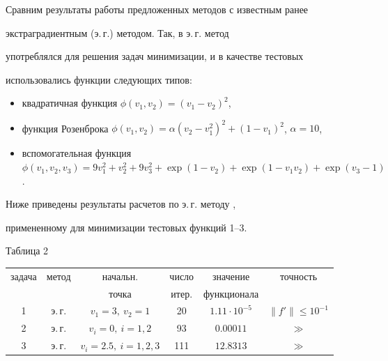  


Сравним результаты работы предложенных методов с известным ранее 


экстраградиентным (э.\,г.) методом. Так, в \cite{4} э.\,г. метод 


употреблялся для решения задач минимизации, и в качестве тестовых 


использовались функции следующих типов: 


\begin{itemize} 


\item[1.] квадратичная функция $\phi(v_1,v_2)=(v_1-v_2)^2$, 


\item[2.] функция Розенброка $\phi(v_1,v_2)=\alpha(v_2-v^2_1)^2+ 


(1-v_1)^2$, $\alpha=10$, 


\item[3.] вспомогательная функция $\phi(v_1,v_2,v_3)=9v^2_1+v^2_2+ 


9v^2_3+\exp(1-v_2)+\exp(1-v_1v_2)+\exp(v_3-1)$. 


\end{itemize}


 


Ниже приведены результаты расчетов по э.\,г. методу \cite{4}, 


примененному для минимизации тестовых функций 1--3. 


\smallskip 


 


{\hfill Таблица 2} 


\smallskip 


{\begin{center} 


\begin{tabular}{|c|c|c|c|c|c|} 


\hline 


задача & метод & начальн. & число & значение & точность \\ 


\ & \ & точка & итер. & функционала & \ \\ 


\hline 


1 & э.\,г. & $v_1=3,\ v_2=1$ & 20 & $1.11\cdot10^{-5}$ & 


$\|f'\|\le10^{-1}$ \\ 


\hline 


2 & э.\,г. & $v_i=0,\ i=1,2$ & 93 & $0.00011$ & $\gg$ \\ 


\hline 


3 & э.\,г. & $v_i=2.5,\ i=1,2,3$ & 111 & $12.8313$ & $\gg$\\ 


\hline 


\end{tabular} 


\end{center} 


} 


